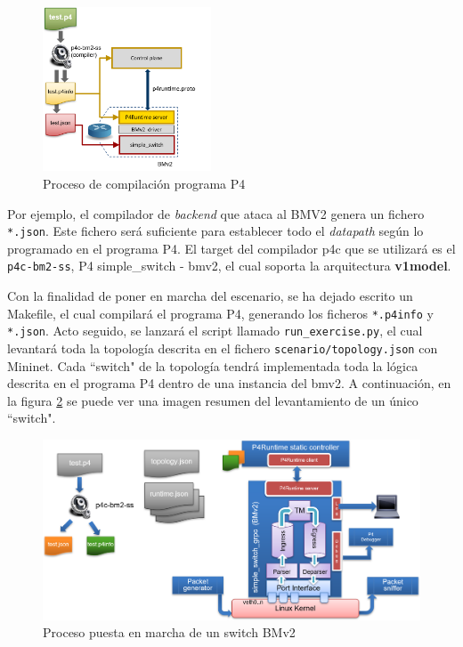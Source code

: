 \begin{figure}[ht]
    \centering
    \includegraphics[width=5cm]{archivos/img/dev/p4/case01/compilation_bmv2.png}
    \caption{Proceso de compilación programa P4}
    \label{fig:case01_p4_ether_intro}
\end{figure}

Por ejemplo, el compilador de \textit{backend} que ataca al BMV2 genera un fichero \texttt{*.json}. Este fichero será suficiente para establecer todo el \textit{datapath} según lo programado en el programa P4. El target del compilador p4c que se utilizará es el \texttt{p4c-bm2-ss}, P4 simple\_switch - bmv2, el cual soporta la arquitectura \textbf{v1model}.\\
\par
Con la finalidad de poner en marcha del escenario, se ha dejado escrito un Makefile, el cual compilará el programa P4, generando los ficheros \texttt{*.p4info} y \texttt{*.json}. Acto seguido, se lanzará el script llamado \texttt{run\_exercise.py}, el cual levantará toda la topología descrita en el fichero \texttt{scenario/topology.json} con Mininet. Cada ``switch" de la topología tendrá implementada toda la lógica descrita en el programa P4 dentro de una instancia del \gls{bmv2}. A continuación, en la figura \ref{fig:case01_p4_ether_intro2} se puede ver una imagen resumen del levantamiento de un único ``switch".\\
\par
\vspace{0.5cm}
\begin{figure}[ht]
    \centering
    \includegraphics[width=15cm]{archivos/img/dev/p4/case01/setup.png}
    \caption{Proceso puesta en marcha de un switch BMv2 \cite{p42}}
    \label{fig:case01_p4_ether_intro2}
\end{figure}

